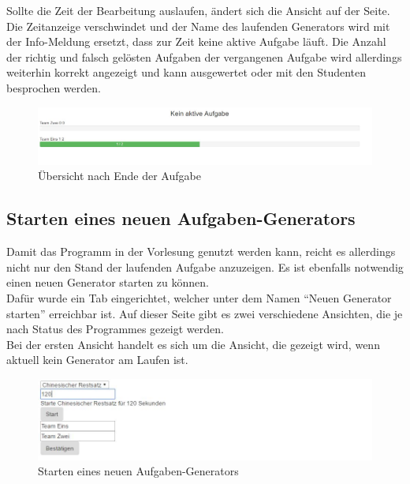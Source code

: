 Sollte die Zeit der Bearbeitung auslaufen, ändert sich die Ansicht auf der Seite. Die Zeitanzeige verschwindet und der Name des laufenden Generators wird mit der Info-Meldung ersetzt, dass zur Zeit keine aktive Aufgabe läuft. Die Anzahl der richtig und falsch gelösten Aufgaben der vergangenen Aufgabe wird allerdings weiterhin korrekt angezeigt und kann ausgewertet oder mit den Studenten besprochen werden.

\begin{figure}[htp]     %
\centering
\includegraphics[width=1\textwidth]{bilder/TaskOver} 
\caption[Übersicht nach Ende der Aufgabe]{Übersicht nach Ende der Aufgabe}
\end{figure} 


\subsection{Starten eines neuen Aufgaben-Generators}

Damit das Programm in der Vorlesung genutzt werden kann, reicht es allerdings nicht nur den Stand der laufenden Aufgabe anzuzeigen. Es ist ebenfalls notwendig einen neuen Generator starten zu können. \\
Dafür wurde ein Tab eingerichtet, welcher unter dem Namen ``Neuen Generator starten'' erreichbar ist.
Auf dieser Seite gibt es zwei verschiedene Ansichten, die je nach Status des Programmes gezeigt werden. \\

Bei der ersten Ansicht handelt es sich um die Ansicht, die gezeigt wird, wenn aktuell kein Generator am Laufen ist. \\

\begin{figure}[htp]     %
\centering
\includegraphics[width=1\textwidth]{bilder/StartNew} 
\caption[Starten eines neuen Aufgaben-Generators]{Starten eines neuen Aufgaben-Generators}
\end{figure} 

